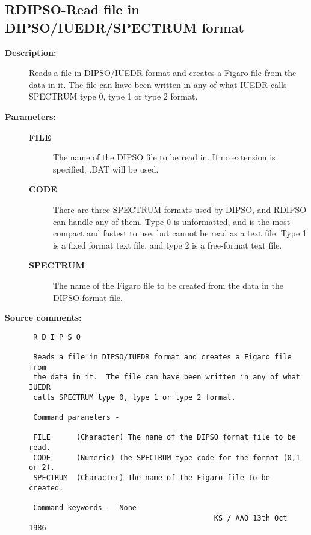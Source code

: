 \subsection{RDIPSO-\label{RDIPSO}Read file in DIPSO/IUEDR/SPECTRUM format}
\begin{description}

\item [{\bf Description:}]
 Reads a file in DIPSO/IUEDR format and creates a Figaro file
 from the data in it.  The file can have been written in any
 of what IUEDR calls SPECTRUM type 0, type 1 or type 2 format.

\item [{\bf Parameters:}]
\begin{description}
\item [{\bf FILE}]
 The name of the DIPSO file to be read in.
 If no extension is specified, .DAT will be used.
\item [{\bf CODE}]
 There are three SPECTRUM formats used by DIPSO, and
 RDIPSO can handle any of them.  Type 0 is unformatted,
 and is the most compact and fastest to use, but cannot
 be read as a text file.  Type 1 is a fixed format text
 file, and type 2 is a free-format text file.
\item [{\bf SPECTRUM}]
 The name of the Figaro file to be created from
 the data in the DIPSO format file.
\end{description}

\item [{\bf Source comments:}]
\begin{verbatim}
 R D I P S O

 Reads a file in DIPSO/IUEDR format and creates a Figaro file from
 the data in it.  The file can have been written in any of what IUEDR
 calls SPECTRUM type 0, type 1 or type 2 format.

 Command parameters -

 FILE      (Character) The name of the DIPSO format file to be read.
 CODE      (Numeric) The SPECTRUM type code for the format (0,1 or 2).
 SPECTRUM  (Character) The name of the Figaro file to be created.

 Command keywords -  None
                                           KS / AAO 13th Oct 1986
\end{verbatim}
\end{description}
